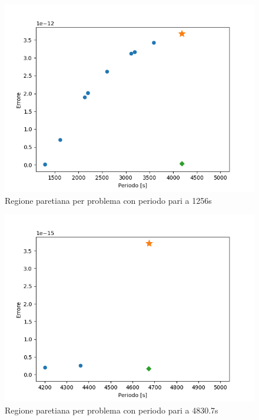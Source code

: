 \documentclass[a4paper,12pt]{report}
\begin{document}
\begin{figure}[H]
  \centering
  \includegraphics[scale=0.70]{img/puls005/utopia/principale.png}
  \caption{Regione paretiana per problema con periodo pari a 1256s}
  \label{fig:005t}
\end{figure}

\begin{figure}[H]
  \centering
  \includegraphics[scale=0.70]{img/puls0013/utopia/principale.png}
  \caption{Regione paretiana per problema con periodo pari a 4830.7s}
  \label{fig:0013t}
\end{figure}
\end{document}
